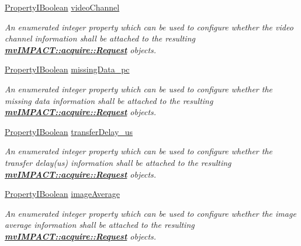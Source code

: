 \begin{DoxyCompactItemize}
\hyperlink{group___common_interface_ga44f9437e24b21b6c93da9039ec6786aa}{Property\+I\+Boolean} \hyperlink{classmv_i_m_p_a_c_t_1_1acquire_1_1_request_info_configuration_a69d84f98843b1ab417e6d18a4038a9bd}{video\+Channel}
\begin{DoxyCompactList}\small\item\em An enumerated integer property which can be used to configure whether the video channel information shall be attached to the resulting {\bfseries \hyperlink{classmv_i_m_p_a_c_t_1_1acquire_1_1_request}{mv\+I\+M\+P\+A\+C\+T\+::acquire\+::\+Request}} objects. \end{DoxyCompactList}\item 
\hyperlink{group___common_interface_ga44f9437e24b21b6c93da9039ec6786aa}{Property\+I\+Boolean} \hyperlink{classmv_i_m_p_a_c_t_1_1acquire_1_1_request_info_configuration_afde6ca0fa4de8ea8b77f70a1056c4549}{missing\+Data\+\_\+pc}
\begin{DoxyCompactList}\small\item\em An enumerated integer property which can be used to configure whether the missing data information shall be attached to the resulting {\bfseries \hyperlink{classmv_i_m_p_a_c_t_1_1acquire_1_1_request}{mv\+I\+M\+P\+A\+C\+T\+::acquire\+::\+Request}} objects. \end{DoxyCompactList}\item 
\hyperlink{group___common_interface_ga44f9437e24b21b6c93da9039ec6786aa}{Property\+I\+Boolean} \hyperlink{classmv_i_m_p_a_c_t_1_1acquire_1_1_request_info_configuration_abd2890ec09751a998abfee51e5d577fc}{transfer\+Delay\+\_\+us}
\begin{DoxyCompactList}\small\item\em An enumerated integer property which can be used to configure whether the transfer delay(us) information shall be attached to the resulting {\bfseries \hyperlink{classmv_i_m_p_a_c_t_1_1acquire_1_1_request}{mv\+I\+M\+P\+A\+C\+T\+::acquire\+::\+Request}} objects. \end{DoxyCompactList}\item 
\hyperlink{group___common_interface_ga44f9437e24b21b6c93da9039ec6786aa}{Property\+I\+Boolean} \hyperlink{classmv_i_m_p_a_c_t_1_1acquire_1_1_request_info_configuration_a89dcb6d89e7c15d6fcc203e4aa69b849}{image\+Average}
\begin{DoxyCompactList}\small\item\em An enumerated integer property which can be used to configure whether the image average information shall be attached to the resulting {\bfseries \hyperlink{classmv_i_m_p_a_c_t_1_1acquire_1_1_request}{mv\+I\+M\+P\+A\+C\+T\+::acquire\+::\+Request}} objects. \end{DoxyCompactList}\item 

\end{DoxyCompactItemize}
